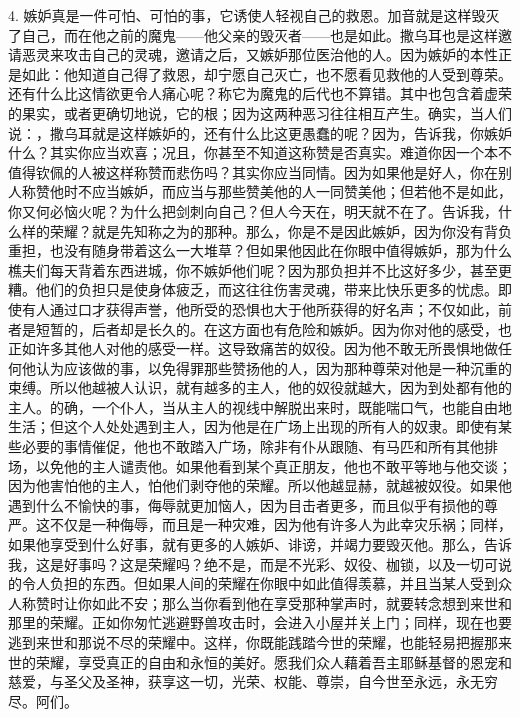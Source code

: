 4. 嫉妒真是一件可怕、可怕的事，它诱使人轻视自己的救恩。加音就是这样毁灭了自己，而在他之前的魔鬼——他父亲的毁灭者——也是如此。撒乌耳也是这样邀请恶灵来攻击自己的灵魂，邀请之后，又嫉妒那位医治他的人。因为嫉妒的本性正是如此：他知道自己得了救恩，却宁愿自己灭亡，也不愿看见救他的人受到尊荣。还有什么比这情欲更令人痛心呢？称它为魔鬼的后代也不算错。其中也包含着虚荣的果实，或者更确切地说，它的根；因为这两种恶习往往相互产生。确实，当人们说：，撒乌耳就是这样嫉妒的，还有什么比这更愚蠢的呢？因为，告诉我，你嫉妒什么？其实你应当欢喜；况且，你甚至不知道这称赞是否真实。难道你因一个本不值得钦佩的人被这样称赞而悲伤吗？其实你应当同情。因为如果他是好人，你在别人称赞他时不应当嫉妒，而应当与那些赞美他的人一同赞美他；但若他不是如此，你又何必恼火呢？为什么把剑刺向自己？但人今天在，明天就不在了。告诉我，什么样的荣耀？就是先知称之为的那种。那么，你是不是因此嫉妒，因为你没有背负重担，也没有随身带着这么一大堆草？但如果他因此在你眼中值得嫉妒，那为什么樵夫们每天背着东西进城，你不嫉妒他们呢？因为那负担并不比这好多少，甚至更糟。他们的负担只是使身体疲乏，而这往往伤害灵魂，带来比快乐更多的忧虑。即使有人通过口才获得声誉，他所受的恐惧也大于他所获得的好名声；不仅如此，前者是短暂的，后者却是长久的。在这方面也有危险和嫉妒。因为你对他的感受，也正如许多其他人对他的感受一样。这导致痛苦的奴役。因为他不敢无所畏惧地做任何他认为应该做的事，以免得罪那些赞扬他的人，因为那种尊荣对他是一种沉重的束缚。所以他越被人认识，就有越多的主人，他的奴役就越大，因为到处都有他的主人。的确，一个仆人，当从主人的视线中解脱出来时，既能喘口气，也能自由地生活；但这个人处处遇到主人，因为他是在广场上出现的所有人的奴隶。即使有某些必要的事情催促，他也不敢踏入广场，除非有仆从跟随、有马匹和所有其他排场，以免他的主人谴责他。如果他看到某个真正朋友，他也不敢平等地与他交谈；因为他害怕他的主人，怕他们剥夺他的荣耀。所以他越显赫，就越被奴役。如果他遇到什么不愉快的事，侮辱就更加恼人，因为目击者更多，而且似乎有损他的尊严。这不仅是一种侮辱，而且是一种灾难，因为他有许多人为此幸灾乐祸；同样，如果他享受到什么好事，就有更多的人嫉妒、诽谤，并竭力要毁灭他。那么，告诉我，这是好事吗？这是荣耀吗？绝不是，而是不光彩、奴役、枷锁，以及一切可说的令人负担的东西。但如果人间的荣耀在你眼中如此值得羡慕，并且当某人受到众人称赞时让你如此不安；那么当你看到他在享受那种掌声时，就要转念想到来世和那里的荣耀。正如你匆忙逃避野兽攻击时，会进入小屋并关上门；同样，现在也要逃到来世和那说不尽的荣耀中。这样，你既能践踏今世的荣耀，也能轻易把握那来世的荣耀，享受真正的自由和永恒的美好。愿我们众人藉着吾主耶稣基督的恩宠和慈爱，与圣父及圣神，获享这一切，光荣、权能、尊崇，自今世至永远，永无穷尽。阿们。\par

